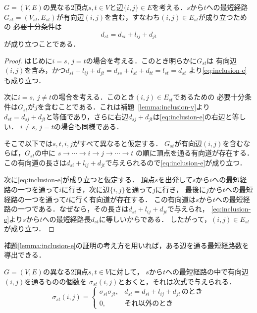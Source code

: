 \begin{lemma}
  \label{lemma:inclusion-e}
  $G=(V,E)$の異なる2頂点$s,t\in V$と辺$\{i,j\} \in E$を考える．$s$から$t$への最短経路
  $G_{st}=(V_{st},E_{st})$が有向辺$(i,j)$を含む，すなわち$(i,j) \in E_{st}$が成り立つための
  必要十分条件は
  \begin{equation}
    d_{st}=d_{si}+l_{ij}+d_{jt}
    \label{eq:inclusion-e}
  \end{equation}
  が成り立つことである．
\end{lemma}
\begin{proof}
  はじめに$i=s$, $j=t$の場合を考える．このとき明らかに$G_{st}$は
  有向辺$(i,j)$を含み，かつ$d_{si}+l_{ij}+d_{jt}=d_{ss}+l_{st}+d_{tt}=l_{st}=d_{st}$
  より\eqref{eq:inclusion-e}も成り立つ．

  次に$i=s$, $j \neq t$の場合を考える．このとき$(i,j)\in E_{st}$であるための
  必要十分条件は$G_{st}$が$j$を含むことである．これは補題~\ref{lemma:inclusion-v}より
  $d_{st}=d_{sj}+d_{jt}$と等価であり，さらに右辺$d_{sj}+d_{jt}$は\eqref{eq:inclusion-e}の右辺と等しい．
  $i\neq s$, $j=t$の場合も同様である．

  そこで以下では$s,t,i,j$がすべて異なると仮定する．
  $G_{st}$が有向辺$(i,j)$を含むならば，$G_{st}$の中に
  $s \rightarrow \cdots \rightarrow i \rightarrow j \rightarrow \cdots \rightarrow t$
  の順に頂点を通る有向道が存在する．
  この有向道の長さは$d_{si}+l_{ij}+d_{jt}$で与えられるので\eqref{eq:inclusion-e}が成り立つ．

  次に\eqref{eq:inclusion-e}が成り立つと仮定する．
  頂点$s$を出発して$s$から$i$への最短経路の一つを通って$i$に行き，次に辺$\{i,j\}$を通って$j$に行き，
  最後に$j$から$t$への最短経路の一つを通って$t$に行く有向道が存在する．
  この有向道は$s$から$t$への最短経路の一つである．なぜなら，その長さは$d_{si}+l_{ij}+d_{jt}$で与えられ，
  \eqref{eq:inclusion-e}より$s$から$t$への最短経路長$d_{st}$に等しいからである．
  したがって，$(i,j) \in E_{st}$が成り立つ．
\end{proof}

補題\ref{lemma:inclusion-e}の証明の考え方を用いれば，ある辺を通る最短経路数を導出できる．

\begin{lemma-without-proof}
  $G=(V,E)$の異なる2頂点$s,t \in V$に対して，
  $s$から$t$への最短経路の中で有向辺$(i,j)$を通るものの個数を
  $\sigma_{st}(i,j)$とおくと，それは次式で与えられる．
  \begin{equation*}
    \sigma_{st}(i,j)=
    \begin{cases}
      \sigma_{si} \sigma_{jt}, & d_{st}=d_{si}+l_{ij}+d_{jt}\,\text{のとき} \\
      0, & \text{それ以外のとき}
    \end{cases}
  \end{equation*}
\end{lemma-without-proof}

